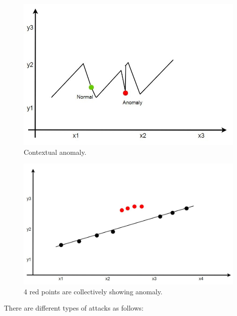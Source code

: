 \begin{figure}[bth]
  \includegraphics[width=\linewidth]{contextual.JPG}
  \caption{Contextual anomaly.}
  \label{fig:point}
\end{figure}

\begin{figure}[h]
  \includegraphics[width=\linewidth]{collective.JPG}
  \caption{4 red points are collectively showing anomaly.}
  \label{fig:point}
\end{figure}

There are different types of  attacks as follows:

